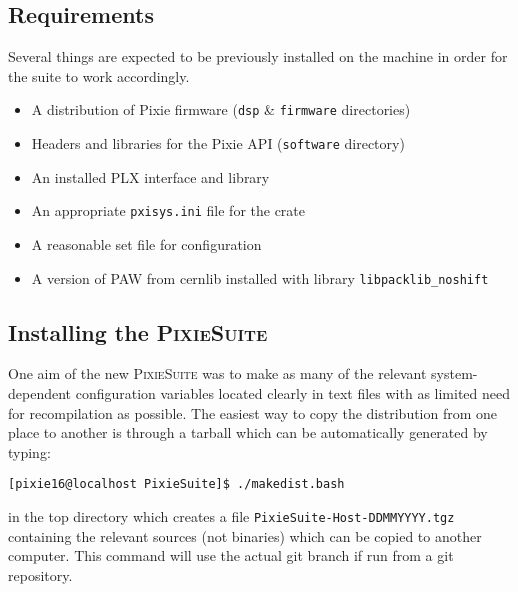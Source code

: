 \documentclass{article}
\begin{document}
\subsection{Requirements}
Several things are expected to be previously installed on the machine in order for the suite to work accordingly.
\begin{itemize}
\item A distribution of Pixie firmware (\texttt{dsp} \& \texttt{firmware} directories)
\item Headers and libraries for the Pixie API (\texttt{software} directory)
\item An installed PLX interface and library
\item An appropriate \texttt{pxisys.ini} file for the crate
\item A reasonable set file for configuration
\item A version of PAW from cernlib installed with library \texttt{libpacklib\_noshift}
\end{itemize}
\subsection{Installing the \textsc{PixieSuite}}
One aim of the new \textsc{PixieSuite} was to make as many of the relevant system-dependent configuration variables located clearly in text files with as limited need for recompilation as possible. The easiest way to copy the distribution from one place to another is through a tarball which can be automatically generated by typing:
\begin{verbatim}
[pixie16@localhost PixieSuite]$ ./makedist.bash
\end{verbatim}
in the top directory which creates a file
\texttt{PixieSuite-Host-DDMMYYYY.tgz} containing the relevant sources (not
binaries) which can be copied to another computer. This command will use the
actual git branch if run from a git repository.
\end{document}
